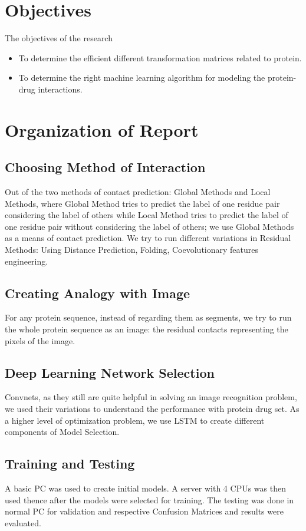 \section{Objectives}
The objectives of the research 
\begin{itemize}
    \item To determine the efficient different transformation matrices related to protein.
    \item To determine the right machine learning algorithm for modeling the protein-drug interactions.
\end{itemize}




\section{Organization of Report}

\subsection{Choosing Method of Interaction}
Out of the two methods of contact prediction: Global Methods and Local Methods, where Global Method tries to predict the label of one residue pair considering the label of others while Local Method tries to predict the label of one residue pair without considering the label of others; we use Global Methods as a means of contact prediction. We try to run different variations in Residual Methods: Using Distance Prediction, Folding, Coevolutionary features engineering. 

\subsection{Creating Analogy with Image}
For any protein sequence, instead of regarding them as segments, we try to run the whole protein sequence as an image: the residual contacts representing the pixels of the image.

\subsection{Deep Learning Network Selection}
Convnets, as they still are quite helpful in solving an image recognition problem, we used their variations to understand the performance with protein drug set. As a higher level of optimization problem, we use LSTM to create different components of Model Selection. 

\subsection{Training and Testing}
A basic PC was used to create initial models. A server with 4 CPUs was then used thence after the models were selected for training. The testing was done in normal PC for validation and respective Confusion Matrices and results were evaluated.
